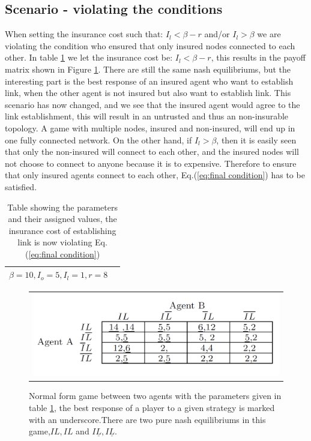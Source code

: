 \subsection{Scenario - violating the conditions}
When setting the insurance cost such that: $I_{l}<\beta - r$ and/or $I_{l}>\beta$ we are violating the condition who ensured that only insured nodes connected to each other. In table \ref{tbl:simplegamevalue2} we let the insurance cost be: $I_{l}<\beta - r$, this results in the payoff matrix shown in Figure \ref{fig:NFnumbersViolating}. There are still the same nash equilibriums, but the interesting part is the best response of an insured agent who want to establish link, when the other agent is not insured but also want to establish link. This scenario has now changed, and we see that the insured agent would agree to the link establishment, this will result in an untrusted and thus an non-insurable topology. A game with multiple nodes, insured and non-insured, will end up in one fully connected network.
On the other hand, if $I_{l}>\beta$, then it is easily seen that only the non-insured will connect to each other, and the insured nodes will not choose to connect to anyone because it is to expensive.
 Therefore to ensure that only insured agents connect to each other, Eq.(\ref{eq:final condition}) has to be satisfied. 
\begin{table}[h]
\centering
\begin{tabular}{lc}
 \hline
  $\beta=10,
  I_{o}=5,
  I_{l}=1,
  r=8$\\
  \hline
\end{tabular}
\caption{Table showing the parameters and their assigned values, the insurance cost of establishing link is now violating Eq.(\ref{eq:final condition}) \label{tbl:simplegamevalue2}}
\end{table}

\begin{figure}[h]
\centering
\begin{tabular}{@{}c@{}}
\includegraphics[width=1.0\textwidth]{../Figures/NotOptimalGameWithNumbers.png}
\end{tabular}
\caption[Caption for LOF]{Normal form game between two agents with the parameters given in table \ref{tbl:simplegamevalue2}, the best response of a player to a given strategy is marked with an underscore.There are two pure nash equilibriums in this game,$IL,IL$ and $I\underline{L},I\underline{L}$. \label{fig:NFnumbersViolating}}
\end{figure}


